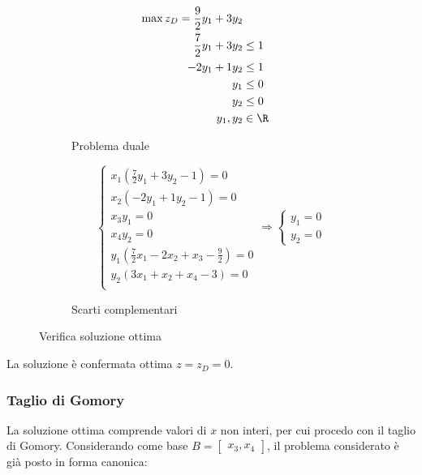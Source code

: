 \documentclass[\main/main.tex]{subfiles}
\begin{document}
\begin{figure}
  \begin{subfigure}{0.49\textwidth}
    \begin{align*}
      \max z_D = \frac{9}{2}y_1 + 3y_2 \\
      \frac{7}{2}y_1 + 3y_2 & \leq 1   \\
      -2y_1 + 1y_2          & \leq 1   \\
      y_1                   & \leq 0   \\
      y_2                   & \leq 0   \\
      y_1, y_2              & \in \R
    \end{align*}
    \caption{Problema duale}
  \end{subfigure}
  \begin{subfigure}{0.49\textwidth}
    \[
      \begin{cases}
        x_1(\frac{7}{2}y_1 + 3y_2 -1) = 0               \\
        x_2(-2y_1 + 1y_2          -1) = 0               \\
        x_3y_1 = 0                                      \\
        x_4y_2 = 0                                      \\
        y_1(\frac{7}{2}x_1 - 2x_2 + x_3 -\frac{9}{2})=0 \\
        y_2(3x_1 + x_2 + x_4            -3          )=0 \\
      \end{cases}
      \Rightarrow
      \begin{cases}
        y_1 = 0 \\
        y_2 = 0
      \end{cases}
    \]
    \caption{Scarti complementari}
  \end{subfigure}
  \caption{Verifica soluzione ottima}
\end{figure}

La soluzione è confermata ottima $z=z_D=0$.

\subsubsection*{Taglio di Gomory}
La soluzione ottima comprende valori di $x$ non interi, per cui procedo con il taglio di Gomory. Considerando come base $B = \begin{bmatrix}
    x_3, x_4
  \end{bmatrix}$, il problema considerato è già posto in forma canonica:
\end{document}

